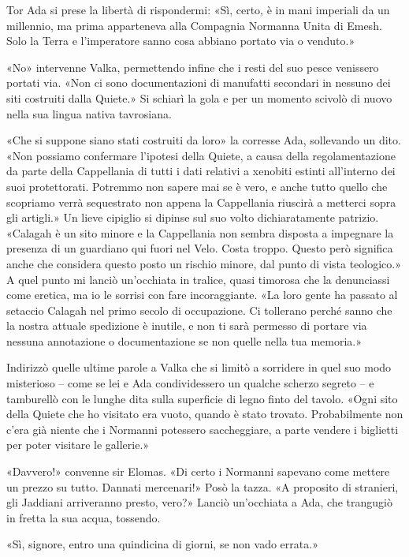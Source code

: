Tor Ada si prese la libertà di rispondermi: «Sì, certo, è in mani
imperiali da un millennio, ma prima apparteneva alla Compagnia Normanna
Unita di Emesh. Solo la Terra e l'imperatore sanno cosa abbiano portato
via o venduto.»

«No» intervenne Valka, permettendo infine che i resti del suo pesce
venissero portati via. «Non ci sono documentazioni di manufatti
secondari in nessuno dei siti costruiti dalla Quiete.» Si schiarì la
gola e per un momento scivolò di nuovo nella sua lingua nativa
tavrosiana.

«Che si suppone siano stati costruiti da loro» la corresse Ada,
sollevando un dito. «Non possiamo confermare l'ipotesi della Quiete, a
causa della regolamentazione da parte della Cappellania di tutti i dati
relativi a xenobiti estinti all'interno dei suoi protettorati. Potremmo
non sapere mai se è vero, e anche tutto quello che scopriamo verrà
sequestrato non appena la Cappellania riuscirà a metterci sopra gli
artigli.» Un lieve cipiglio si dipinse sul suo volto dichiaratamente
patrizio. «Calagah è un sito minore e la Cappellania non sembra disposta
a impegnare la presenza di un guardiano qui fuori nel Velo. Costa
troppo. Questo però significa anche che considera questo posto un
rischio minore, dal punto di vista {teologico}.» A quel punto mi lanciò
un'occhiata in tralice, quasi timorosa che la denunciassi come eretica,
ma io le sorrisi con fare incoraggiante. «La loro gente ha passato al
setaccio Calagah nel primo secolo di occupazione. Ci tollerano perché
sanno che la nostra attuale spedizione è inutile, e non ti sarà permesso
di portare via nessuna annotazione o documentazione se non quelle nella
tua memoria.»

Indirizzò quelle ultime parole a Valka che si limitò a sorridere in quel
suo modo misterioso -- come se lei e Ada condividessero un qualche
scherzo segreto -- e tamburellò con le lunghe dita sulla superficie di
legno finto del tavolo. «Ogni sito della Quiete che ho visitato era
vuoto, quando è stato trovato. Probabilmente non c'era già niente che i
Normanni potessero saccheggiare, a parte vendere i biglietti per poter
visitare le gallerie.»

«Davvero!» convenne sir Elomas. «Di certo i Normanni sapevano come
mettere un prezzo su tutto. Dannati mercenari!» Posò la tazza. «A
proposito di stranieri, gli Jaddiani arriveranno presto, vero?» Lanciò
un'occhiata a Ada, che trangugiò in fretta la sua acqua, tossendo.

«Sì, signore, entro una quindicina di giorni, se non vado errata.»

